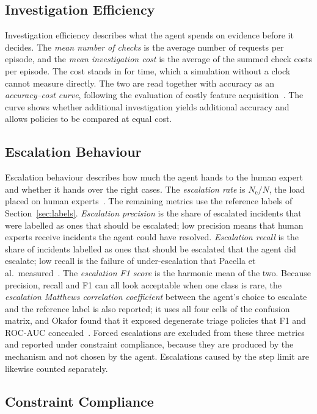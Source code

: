 \subsection{Investigation Efficiency}

Investigation efficiency describes what the agent spends on evidence before it decides. The \emph{mean number of checks} is the average number of requests per episode, and the \emph{mean investigation cost} is the average of the summed check costs per episode. The cost stands in for time, which a simulation without a clock cannot measure directly. The two are read together with accuracy as an \emph{accuracy--cost curve}, following the evaluation of costly feature acquisition~\cite{janisch2019}. The curve shows whether additional investigation yields additional accuracy and allows policies to be compared at equal cost.

\subsection{Escalation Behaviour}

Escalation behaviour describes how much the agent hands to the human expert and whether it hands over the right cases. The \emph{escalation rate} is $N_{\text{e}} / N$, the load placed on human experts~\cite{turan2026}. The remaining metrics use the reference labels of Section~\ref{sec:labels}. \emph{Escalation precision} is the share of escalated incidents that were labelled as ones that should be escalated; low precision means that human experts receive incidents the agent could have resolved. \emph{Escalation recall} is the share of incidents labelled as ones that should be escalated that the agent did escalate; low recall is the failure of under-escalation that Pacella et al.\ measured~\cite{pacella2026}. The \emph{escalation F1 score} is the harmonic mean of the two. Because precision, recall and F1 can all look acceptable when one class is rare, the \emph{escalation Matthews correlation coefficient} between the agent's choice to escalate and the reference label is also reported; it uses all four cells of the confusion matrix, and Okafor found that it exposed degenerate triage policies that F1 and ROC-AUC concealed~\cite{okafor2026}. Forced escalations are excluded from these three metrics and reported under constraint compliance, because they are produced by the mechanism and not chosen by the agent. Escalations caused by the step limit are likewise counted separately.

\subsection{Constraint Compliance}

